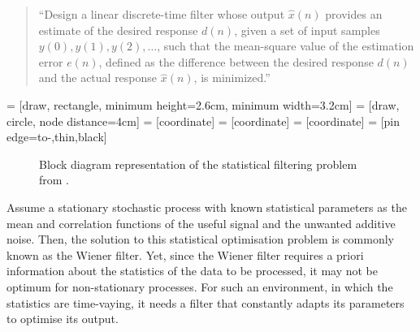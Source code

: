 \begin{quote}``Design a linear discrete-time filter whose output $\hat{x}(n)$ provides an estimate of the desired response $d(n)$, given a set of input samples $y(0), y(1), y(2), \dots$, such that the mean-square value of the estimation error $e(n)$, defined as the difference between the desired response $d(n)$ and the actual response $\hat{x}(n)$, is minimized.''
\end{quote}

 = [draw, rectangle, 
    minimum height=2.6cm, minimum width=3.2cm]
 = [draw, circle, node distance=4cm]
 = [coordinate]
 = [coordinate]
 = [coordinate]
 = [pin edge={to-,thin,black}]

\begin{figure}
\centering
{}
\caption{Block diagram representation of the statistical filtering problem from \cite{haykin2002adaptive}.} \label{fig:filtering_problem}
\end{figure}

Assume a stationary stochastic process with known statistical parameters as the mean and correlation functions of the useful signal and the unwanted additive noise. Then, the solution to this statistical optimisation problem is commonly known as the Wiener filter. Yet, since the Wiener filter requires a priori information about the statistics of the data to be processed, it may not be optimum for non-stationary processes. For such an environment, in which the statistics are time-vaying, it needs a filter that constantly adapts its parameters to optimise its output.

